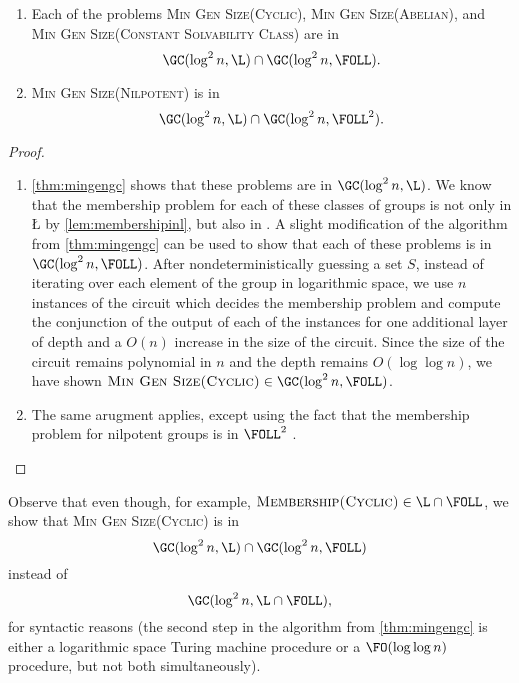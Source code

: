 \documentclass{article}
\begin{document}
\begin{theorem}
  \mbox{}
  \begin{enumerate}
  \item Each of the problems \textsc{Min Gen Size(Cyclic)}, \textsc{Min Gen Size(Abelian)}, and \textsc{Min Gen Size(Constant Solvability Class)} are in
    \begin{equation*}
      \GC(\log^2 n, \L) \cap \GC(\log^2 n, \FOLL).
    \end{equation*}
  \item \textsc{Min Gen Size(Nilpotent)} is in
    \begin{equation*}
      \GC(\log^2 n, \L) \cap \GC(\log^2 n, \FOLL^2).
    \end{equation*}
  \end{enumerate}
\end{theorem}
\begin{proof}
  \mbox{}
  \begin{enumerate}
  \item
    \autoref{thm:mingengc} shows that these problems are in $\GC(\log^2 n, \L)$.
    We know that the membership problem for each of these classes of groups is not only in \L{} by \autoref{lem:membershipinl}, but also in \FOLL{} \cite[Section~3]{bklm01}.
    A slight modification of the algorithm from \autoref{thm:mingengc} can be used to show that each of these problems is in $\GC(\log^2 n, \FOLL)$.
    After nondeterministically guessing a set $S$, instead of iterating over each element of the group in logarithmic space, we use $n$ instances of the \FOLL{} circuit which decides the membership problem and compute the conjunction of the output of each of the instances for one additional layer of depth and a $O(n)$ increase in the size of the circuit.
    Since the size of the circuit remains polynomial in $n$ and the depth remains $O(\log \log n)$, we have shown $\textsc{Min Gen Size(Cyclic)} \in \GC(\log^2 n, \FOLL)$.
  \item The same arugment applies, except using the fact that the membership problem for nilpotent groups is in $\FOLL^2$ \cite[Corollary~3.12]{bklm01}. \qedhere
  \end{enumerate}
\end{proof}
Observe that even though, for example, $\textsc{Membership(Cyclic)} \in \L \cap \FOLL$, we show that \textsc{Min Gen Size(Cyclic)} is in
\begin{equation*}
  \GC(\log^2 n, \L) \cap \GC(\log^2 n, \FOLL)
\end{equation*}
instead of
\begin{equation*}
  \GC(\log^2 n, \L \cap \FOLL),
\end{equation*}
for syntactic reasons (the second step in the algorithm from \autoref{thm:mingengc} is either a logarithmic space Turing machine procedure or a $\FO(\log \log n)$ procedure, but not both simultaneously).
\end{document}
